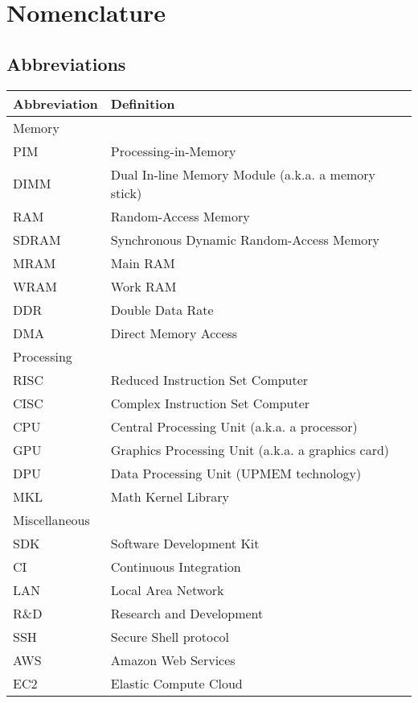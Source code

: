 \chapter*{Nomenclature}

\section*{Abbreviations}

\begin{longtable}{p{2.5cm}p{8cm}}
    \toprule
    Abbreviation & Definition \\
    \midrule\midrule\endhead %
    Memory & \\
    \midrule
    PIM & Processing-in-Memory \\
    DIMM & Dual In-line Memory Module (a.k.a. a memory stick) \\
    RAM & Random-Access Memory \\
    SDRAM & Synchronous Dynamic Random-Access Memory \\
    MRAM & Main RAM \\
    WRAM & Work RAM \\
    DDR & Double Data Rate \\
    DMA & Direct Memory Access \\
    \midrule
    Processing & \\
    \midrule
    RISC & Reduced Instruction Set Computer \\
    CISC & Complex Instruction Set Computer \\
    CPU & Central Processing Unit (a.k.a. a processor) \\
    GPU & Graphics Processing Unit (a.k.a. a graphics card) \\
    DPU & Data Processing Unit (UPMEM technology) \\
    MKL & Math Kernel Library \\
    \midrule
    Miscellaneous & \\
    \midrule
    SDK & Software Development Kit \\
    CI & Continuous Integration \\
    LAN & Local Area Network \\
    R\&D & Research and Development \\
    SSH & Secure Shell protocol \\
    AWS & Amazon Web Services \\
    EC2 & Elastic Compute Cloud \\
    \bottomrule
\end{longtable}

